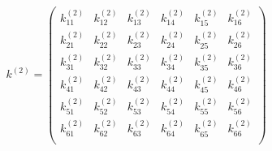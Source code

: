 \begin{equation}
k^{\left(2\right)} = \begin{pmatrix}
k_{11}^{\left(2\right)} & k_{12}^{\left(2\right)} &  k_{13}^{\left(2\right)} &  k_{14}^{\left(2\right)} & k_{15}^{\left(2\right)}  & k_{16}^{\left(2\right)}   \\[0.3em]
k_{21}^{\left(2\right)} & k_{22}^{\left(2\right)} &  k_{23}^{\left(2\right)} &  k_{24}^{\left(2\right)} & k_{25}^{\left(2\right)}  & k_{26}^{\left(2\right)}   \\[0.3em]
k_{31}^{\left(2\right)} & k_{32}^{\left(2\right)} &  k_{33}^{\left(2\right)} &  k_{34}^{\left(2\right)} & k_{35}^{\left(2\right)}  & k_{36}^{\left(2\right)}   \\[0.3em]
k_{41}^{\left(2\right)} & k_{42}^{\left(2\right)} &  k_{43}^{\left(2\right)} &  k_{44}^{\left(2\right)} & k_{45}^{\left(2\right)}  & k_{46}^{\left(2\right)}   \\[0.3em]
k_{51}^{\left(2\right)} & k_{52}^{\left(2\right)} &  k_{53}^{\left(2\right)} &  k_{54}^{\left(2\right)} & k_{55}^{\left(2\right)}  & k_{56}^{\left(2\right)}   \\[0.3em]
k_{61}^{\left(2\right)} & k_{62}^{\left(2\right)} &  k_{63}^{\left(2\right)} &  k_{64}^{\left(2\right)} & k_{65}^{\left(2\right)}  & k_{66}^{\left(2\right)}   \\[0.3em]
\end{pmatrix} 
\end{equation}	

